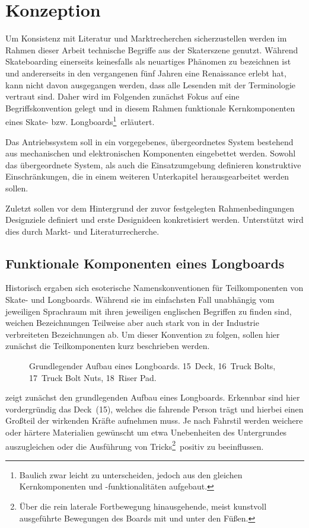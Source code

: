 \chapter{Konzeption}\label{sec:conception}
	Um Konsistenz mit Literatur und Marktrecherchen sicherzustellen werden im Rahmen dieser Arbeit technische Begriffe aus der Skaterszene genutzt.
	Während Skateboarding einerseits keinesfalls als neuartiges Phänomen zu bezeichnen ist und  andererseits in den vergangenen fünf Jahren eine Renaissance erlebt hat, kann nicht davon ausgegangen werden, dass alle Lesenden mit der Terminologie vertraut sind.
	Daher wird im Folgenden zunächst Fokus auf eine Begriffskonvention gelegt und in diesem Rahmen funktionale Kernkomponenten eines Skate- bzw. Longboards\footnote{\hspace{1mm} Baulich zwar leicht zu unterscheiden, jedoch aus den gleichen Kernkomponenten und -funktionalitäten aufgebaut.}~erläutert.\par\medskip
	Das Antriebssystem soll in ein vorgegebenes, übergeordnetes System bestehend aus mechanischen und elektronischen Komponenten eingebettet werden.
	Sowohl das übergeordnete System, als auch die Einsatzumgebung definieren konstruktive Einschränkungen, die in einem weiteren Unterkapitel herausgearbeitet werden sollen.\par\medskip
	Zuletzt sollen vor dem Hintergrund der zuvor festgelegten Rahmenbedingungen Designziele definiert und erste Designideen konkretisiert werden.
	Unterstützt wird dies durch Markt- und Literaturrecherche.
	\section{Funktionale Komponenten eines Longboards}
		Historisch ergaben sich esoterische Namenskonventionen für Teilkomponenten von Skate- und Longboards.
		Während sie im einfachsten Fall unabhängig vom jeweiligen Sprachraum mit ihren jeweiligen englischen Begriffen zu finden sind, weichen Bezeichnungen Teilweise aber auch stark von in der Industrie verbreiteten Bezeichnungen ab.
		Um dieser Konvention zu folgen, sollen hier zunächst die Teilkomponenten kurz beschrieben werden.\par\medskip
		\begin{figure}[h]
			\centering
			
			\caption[Grundlegender Aufbau eines Longboards]{Grundlegender Aufbau eines Longboards. 15~Deck, 16~Truck Bolts, 17~Truck Bolt Nuts, 18~Riser Pad.}\label{fig:longboard}
		\end{figure}
		 zeigt zunächst den grundlegenden Aufbau eines Longboards.
		Erkennbar sind hier vordergründig das Deck~(15), welches die fahrende Person trägt und hierbei einen Großteil der wirkenden Kräfte aufnehmen muss.
		Je nach Fahrstil werden weichere oder härtere Materialien gewünscht um etwa Unebenheiten des Untergrundes auszugleichen oder die Ausführung von Tricks\footnote{\hspace{1mm} Über die rein laterale Fortbewegung hinausgehende, meist kunstvoll ausgeführte Bewegungen des Boards mit und unter den Füßen.}~positiv zu beeinflussen.

